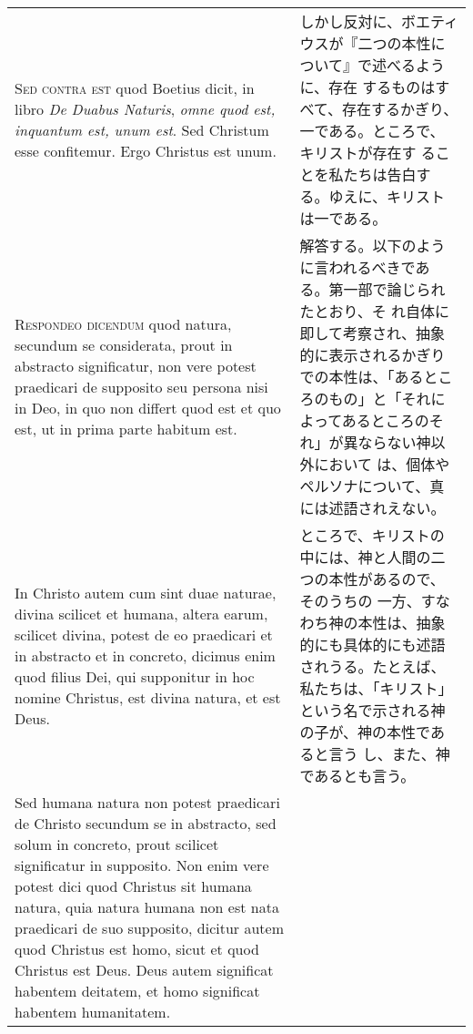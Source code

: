 \documentclass[10pt]{jsarticle} %
\begin{document}
\begin{longtable}{p{21em}p{21em}}
\\


{\scshape Sed contra est} quod Boetius dicit, in
 libro {\itshape De Duabus Naturis}, {\itshape omne quod est, inquantum est, unum est}. Sed
 Christum esse confitemur. Ergo Christus est unum.


&

しかし反対に、ボエティウスが『二つの本性について』で述べるように、存在
するものはすべて、存在するかぎり、一である。ところで、キリストが存在す
ることを私たちは告白する。ゆえに、キリストは一である。


\\


{\scshape Respondeo dicendum} quod natura, secundum se
 considerata, prout in abstracto significatur, non vere potest
 praedicari de supposito seu persona nisi in Deo, in quo non differt
 quod est et quo est, ut in prima parte habitum est. 


&

解答する。以下のように言われるべきである。第一部で論じられたとおり、そ
れ自体に即して考察され、抽象的に表示されるかぎりでの本性は、「あるとこ
ろのもの」と「それによってあるところのそれ」が異ならない神以外において
は、個体やペルソナについて、真には述語されえない。

\\

In Christo autem
 cum sint duae naturae, divina scilicet et humana, altera earum,
 scilicet divina, potest de eo praedicari et in abstracto et in
 concreto, dicimus enim quod filius Dei, qui supponitur in hoc nomine
 Christus, est divina natura, et est Deus. 


&

ところで、キリストの中には、神と人間の二つの本性があるので、そのうちの
一方、すなわち神の本性は、抽象的にも具体的にも述語されうる。たとえば、
私たちは、「キリスト」という名で示される神の子が、神の本性であると言う
し、また、神であるとも言う。

\\

Sed humana natura non potest
 praedicari de Christo secundum se in abstracto, sed solum in concreto,
 prout scilicet significatur in supposito. Non enim vere potest dici
 quod Christus sit humana natura, quia natura humana non est nata
 praedicari de suo supposito, dicitur autem quod Christus est homo,
 sicut et quod Christus est Deus. Deus autem significat habentem
 deitatem, et homo significat habentem humanitatem. 


&


\end{longtable}
\end{document}
